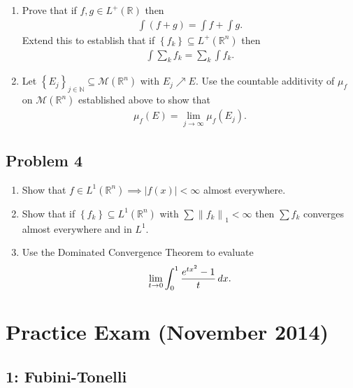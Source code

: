 \begin{enumerate}
\def\labelenumi{\alph{enumi}.}
\item
  Prove that if \(f, g\in L^+({\mathbb{R}})\) then
  \begin{align*}
  \int(f +g) = \int f + \int g
  .\end{align*}
  Extend this to establish that if
  \(\left\{{ f_k}\right\} \subseteq L^+({\mathbb{R}}^n)\) then
  \begin{align*}
    \int \sum_k f_k = \sum_k \int f_k
    .\end{align*}
\item
  Let
  \(\left\{{E_j}\right\}_{j\in {\mathbb{N}}} \subseteq \mathcal{M}({\mathbb{R}}^n)\)
  with \(E_j \nearrow E\). Use the countable additivity of \(\mu_f\) on
  \(\mathcal{M}({\mathbb{R}}^n)\) established above to show that
  \begin{align*}
    \mu_f(E) = \lim_{j\to \infty } \mu_f(E_j)
    .\end{align*}
\end{enumerate}

\hypertarget{problem-4-2}{%
\subsection{Problem 4}\label{problem-4-2}}

\begin{enumerate}
\def\labelenumi{\alph{enumi}.}
\item
  Show that
  \(f\in L^1({\mathbb{R}}^n) \implies {\left\lvert {f(x)} \right\rvert} < \infty\)
  almost everywhere.
\item
  Show that if \(\left\{{f_k}\right\} \subseteq L^1({\mathbb{R}}^n)\)
  with \(\sum {\left\lVert {f_k} \right\rVert}_1 < \infty\) then
  \(\sum f_k\) converges almost everywhere and in \(L^1\).
\item
  Use the Dominated Convergence Theorem to evaluate
  \begin{align*}
  \lim_{t\to 0} \int_0^1 {e^{tx^2} - 1 \over t} \,dx
  .\end{align*}
\end{enumerate}

\hypertarget{practice-exam-november-2014-1}{%
\section{Practice Exam (November
2014)}\label{practice-exam-november-2014-1}}

\hypertarget{fubini-tonelli}{%
\subsection{1: Fubini-Tonelli}\label{fubini-tonelli}}

